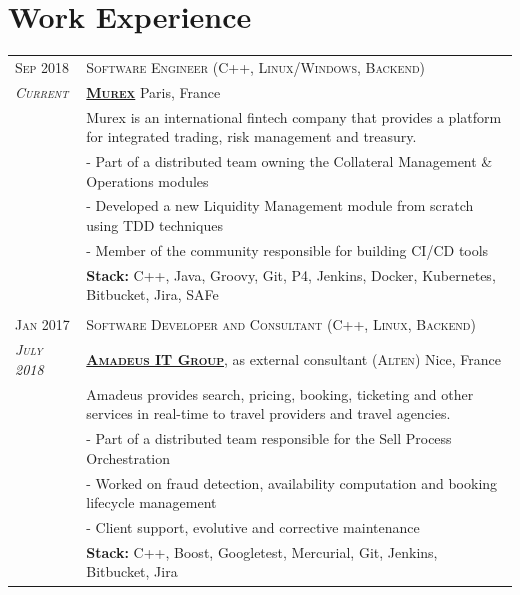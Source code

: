 \documentclass[a4paper,10pt]{article}
\begin{document}
   \vspace{-7.5mm}

   \section{Work Experience}
   \begin{tabular}{p{1.7cm}|p{15.5cm}}
      \centering\textsc{Sep 2018} &
      \textsc{Software Engineer (C++, Linux/Windows, Backend)}\\
      \centering\emph{\textsc{Current}} &
      \textsc{\textbf{\href{https://www.murex.com/}{Murex}}} \hfill Paris, France\\
      & Murex is an international fintech company that provides a platform for integrated trading, risk management and treasury.\\
      & - Part of a distributed team owning the Collateral Management \& Operations modules\\
      & - Developed a new Liquidity Management module from scratch using TDD techniques\\
      & - Member of the community responsible for building CI/CD tools\\
      & \textbf{Stack:} C++, Java, Groovy, Git, P4, Jenkins, Docker, Kubernetes, Bitbucket, Jira, SAFe\\
      
      \multicolumn{2}{c}{} \\
      \centering\textsc{Jan 2017} &
      \textsc{Software Developer and Consultant (C++, Linux, Backend)} \\
      \centering\emph{\textsc{July 2018}} &
      \textsc{\textbf{\href{http://www.amadeus.com/}{Amadeus IT Group}}}, as external consultant (\textsc{Alten}) \hfill Nice, France\\
      & Amadeus provides search, pricing, booking, ticketing and other services in real-time to travel providers and travel agencies.\\
      & - Part of a distributed team responsible for the Sell Process Orchestration\\
      & - Worked on fraud detection, availability computation and booking lifecycle management\\
      & - Client support, evolutive and corrective maintenance\\
      & \textbf{Stack:} C++, Boost, Googletest, Mercurial, Git, Jenkins, Bitbucket, Jira\\


\end{tabular}
\end{document}
